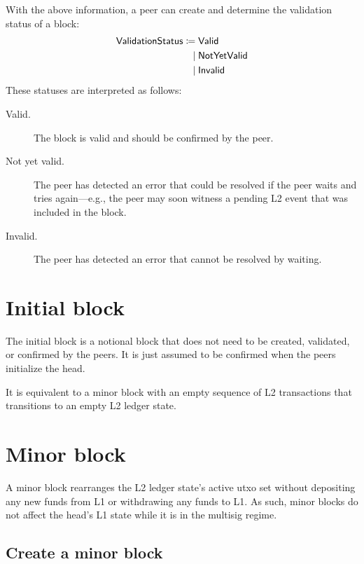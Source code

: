 \documentclass[../hydrozoa.tex]{subfiles}
\begin{document}
With the above information, a peer can create and determine the validation status of a block:
\begin{equation*}
\begin{split}
  \mathsf{ValidationStatus} \coloneq&\;
    \mathsf{Valid} \\\mid&\;
    \mathsf{NotYetValid} \\\mid&\;
    \mathsf{Invalid}
\end{split}
\end{equation*}
These statuses are interpreted as follows:
\begin{description}
  \item[Valid.] The block is valid and should be confirmed by the peer.
  \item[Not yet valid.] The peer has detected an error that could be resolved if the peer waits and tries again---e.g., the peer may soon witness a pending L2 event that was included in the block.
  \item[Invalid.] The peer has detected an error that cannot be resolved by waiting.
\end{description}

\section{Initial block}%
\label{h:l2-initial-block}%

The initial block is a notional block that does not need to be created, validated, or confirmed by the peers.
It is just assumed to be confirmed when the peers initialize the head.

It is equivalent to a minor block with an empty sequence of L2 transactions that transitions to an empty L2 ledger state.

\section{Minor block}%
\label{h:l2-minor-block}%

A minor block rearranges the L2 ledger state's active utxo set without depositing any new funds from L1 or withdrawing any funds to L1.
As such, minor blocks do not affect the head's L1 state while it is in the multisig regime.

\subsection{Create a minor block}%
\label{h:l2-minor-block-create}%
\end{document}

